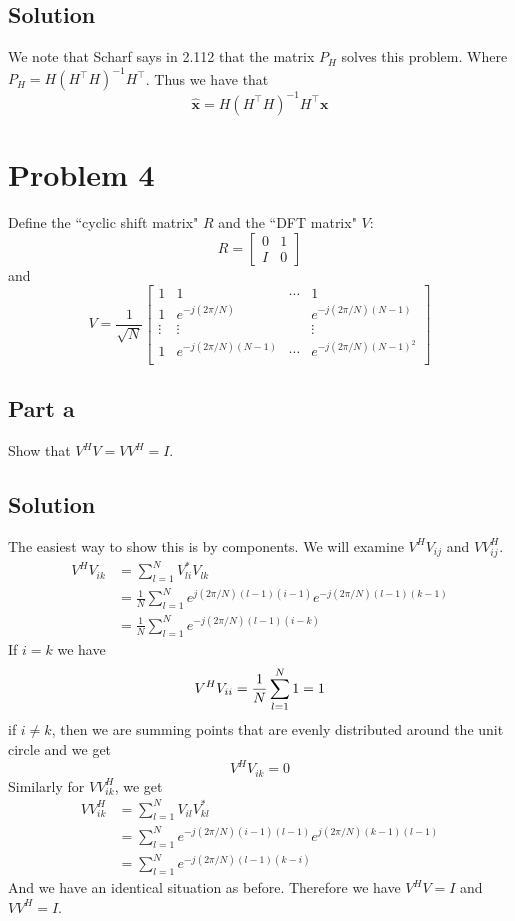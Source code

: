 \documentclass[a4paper]{article}
\begin{document}
\subsection*{Solution}%
We note that Scharf says in 2.112 that the matrix $P_H$ solves this problem. Where $P_H = H(H^\top H)^{-1}H^\top$. Thus we have that
\[
  \hat{\mathbf{x}} = H(H^\top H)^{-1}H^\top \mathbf{x}
\]

\section*{Problem 4}%
Define the ``cyclic shift matrix" $R$ and the ``DFT matrix" $V$:
\[
R = 
\begin{bmatrix}
  0 & 1 \\
  I & 0
\end{bmatrix}
\]
and 
\[ V = \frac{1}{\sqrt{N}}
  \begin{bmatrix}
    1 & 1 & \cdots & 1 \\
    1 & e^{-j(2\pi/N)} & & e^{-j(2\pi/N)(N-1)} \\
    \vdots & \vdots & & \vdots \\
    1 & e^{-j(2\pi/N)(N-1)} & \cdots & e^{-j(2\pi/N)(N-1)^2} \\
  \end{bmatrix}
\]

\subsection*{Part a}%
Show that $V^HV = VV^H = I$.

\subsection*{Solution}%
The easiest way to show this is by components. We will examine $V^HV_{ij}$ and $VV^H_{ij}$.
\[
  \begin{aligned}
    V^HV_{ik} &= \sum_{l=1}^NV_{li}^{*}V_{lk} \\
              &= \frac{1}{N} \sum_{l=1}^N e^{j(2\pi/N)(l-1)(i-1)} e^{-j(2\pi/N)(l-1)(k-1)}\\
              &= \frac{1}{N} \sum_{l=1}^N e^{-j(2\pi/N)(l-1)(i-k)} 
  \end{aligned}
\]
If $i = k$ we have 
\[
    V^HV_{ii} = \frac{1}{N}\sum_{l=1}^N 1 = 1 \\
\]
if $i \neq k$, then we are summing points that are evenly distributed around the unit circle and we get 
\[
  V^HV_{ik} = 0
\]
Similarly for $VV^H_{ik}$, we get
\[
  \begin{aligned}
    VV^H_{ik} &= \sum_{l=1}^NV_{il}V_{kl}^* \\
              &= \sum_{l=1}^Ne^{-j(2\pi/N)(i-1)(l-1)}e^{j(2\pi/N)(k-1)(l-1)} \\
              &= \sum_{l=1}^Ne^{-j(2\pi/N)(l-1)(k-i)}
  \end{aligned}
\]
And we have an identical situation as before. Therefore we have $V^HV = I$ and $VV^H = I$.
\end{document}
